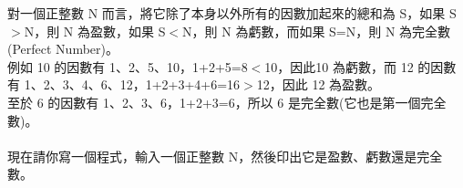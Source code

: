 對一個正整數 N 而言，將它除了本身以外所有的因數加起來的總和為 S，如果 S$>$N，則 N 為盈數，如果 S$<$N，則 N 為虧數，而如果 S=N，則 N 為完全數(Perfect Number)。\\
例如 10 的因數有 1、2、5、10，1+2+5=8$<$10，因此10 為虧數，而 12 的因數有 1、2、3、4、6、12，1+2+3+4+6=16$>$12，因此 12 為盈數。\\
至於 6 的因數有 1、2、3、6，1+2+3=6，所以 6 是完全數(它也是第一個完全數)。\\
\\
現在請你寫一個程式，輸入一個正整數 N，然後印出它是盈數、虧數還是完全數。\\
